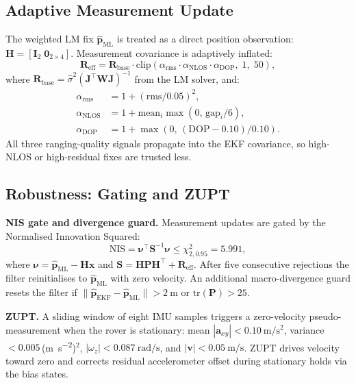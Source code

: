 \subsection{Adaptive Measurement Update}

The weighted LM fix $\hat{\mathbf{p}}_\text{ML}$ is treated as a direct
position observation: $\mathbf{H} = [\mathbf{I}_2\;\mathbf{0}_{2\times4}]$.
Measurement covariance is adaptively inflated:
\begin{equation}
  \mathbf{R}_\text{eff} = \mathbf{R}_\text{base}\cdot
    \mathrm{clip}(\alpha_\text{rms}\cdot\alpha_\text{NLOS}\cdot\alpha_\text{DOP},\;1,\;50),
  \label{eq:Reff}
\end{equation}
where $\mathbf{R}_\text{base} = \hat{\sigma}^2(\mathbf{J}^\top\mathbf{W}\mathbf{J})^{-1}$
from the LM solver, and:
\begin{align*}
  \alpha_\text{rms}  &= 1 + (\text{rms}/0.05)^2, \\
  \alpha_\text{NLOS} &= 1 + \mathrm{mean}_i\max(0,\,\text{gap}_i/6), \\
  \alpha_\text{DOP}  &= 1 + \max(0,\,(\mathrm{DOP}-0.10)/0.10).
\end{align*}
All three ranging-quality signals propagate into the EKF covariance,
so high-NLOS or high-residual fixes are trusted less.

\subsection{Robustness: Gating and ZUPT}

\textbf{NIS gate and divergence guard.}
Measurement updates are gated by the Normalised Innovation Squared:
\begin{equation}
  \mathrm{NIS} = \boldsymbol{\nu}^\top\mathbf{S}^{-1}\boldsymbol{\nu}
    \leq \chi^2_{2,0.95} = 5.991,
  \label{eq:nis}
\end{equation}
where $\boldsymbol{\nu} = \hat{\mathbf{p}}_\text{ML} - \mathbf{H}\mathbf{x}$
and $\mathbf{S} = \mathbf{H}\mathbf{P}\mathbf{H}^\top + \mathbf{R}_\text{eff}$.
After five consecutive rejections the filter reinitialises to
$\hat{\mathbf{p}}_\text{ML}$ with zero velocity.
An additional macro-divergence guard resets the filter if
$\|\hat{\mathbf{p}}_\text{EKF} - \hat{\mathbf{p}}_\text{ML}\| > \SI{2}{\metre}$
or $\mathrm{tr}(\mathbf{P}) > 25$.

\textbf{ZUPT.}
A sliding window of eight IMU samples triggers a zero-velocity
pseudo-measurement when the rover is stationary:
mean $|\mathbf{a}_{xy}| < \SI{0.10}{\metre\per\second\squared}$,
variance $< 0.005$\,(\si{\metre\per\second\squared})$^2$,
$|\omega_z| < \SI{0.087}{\radian\per\second}$, and
$|\mathbf{v}| < \SI{0.05}{\metre\per\second}$.
ZUPT drives velocity toward zero and corrects residual accelerometer offset
during stationary holds via the bias states.

